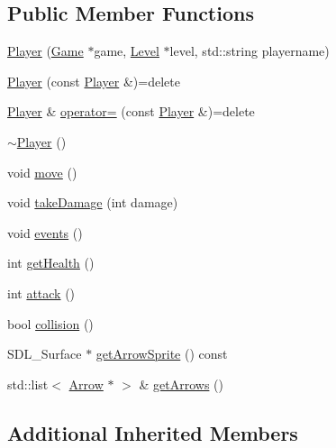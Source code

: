 \subsection*{Public Member Functions}
\begin{DoxyCompactItemize}
\item 
\hyperlink{classPlayer_aa7539e1f537c97414963214a1dc1aa65}{Player} (\hyperlink{classGame}{Game} $\ast$game, \hyperlink{classLevel}{Level} $\ast$level, std\-::string playername)
\item 
\hyperlink{classPlayer_ae8015d1f08ba69d663cfdaea1a64d1a4}{Player} (const \hyperlink{classPlayer}{Player} \&)=delete
\item 
\hyperlink{classPlayer}{Player} \& \hyperlink{classPlayer_ab81d34e4adb4e329d26b1635d866462d}{operator=} (const \hyperlink{classPlayer}{Player} \&)=delete
\item 
\hyperlink{classPlayer_a749d2c00e1fe0f5c2746f7505a58c062}{$\sim$\-Player} ()
\item 
void \hyperlink{classPlayer_ae02ee46d8c20dd0697b975f935b09839}{move} ()
\item 
void \hyperlink{classPlayer_af97f9b32912f28fdcdad1785d515cd2d}{take\-Damage} (int damage)
\item 
void \hyperlink{classPlayer_a9df270c5655b433d057e3e0f8fafd9ae}{events} ()
\item 
int \hyperlink{classPlayer_abcb15d249bed9a4ab0ab86b52b0d747a}{get\-Health} ()
\item 
int \hyperlink{classPlayer_a8ce2d81f916ae4634459d7fccc232c23}{attack} ()
\item 
bool \hyperlink{classPlayer_a740c5163bb90b6b5824aed4817b0c2cc}{collision} ()
\item 
S\-D\-L\-\_\-\-Surface $\ast$ \hyperlink{classPlayer_a9a65f7260bffb2a72c68d8692f447a06}{get\-Arrow\-Sprite} () const 
\item 
std\-::list$<$ \hyperlink{classArrow}{Arrow} $\ast$ $>$ \& \hyperlink{classPlayer_a9282a44ce22f9192413326f26459a7e4}{get\-Arrows} ()
\end{DoxyCompactItemize}
\subsection*{Additional Inherited Members}


